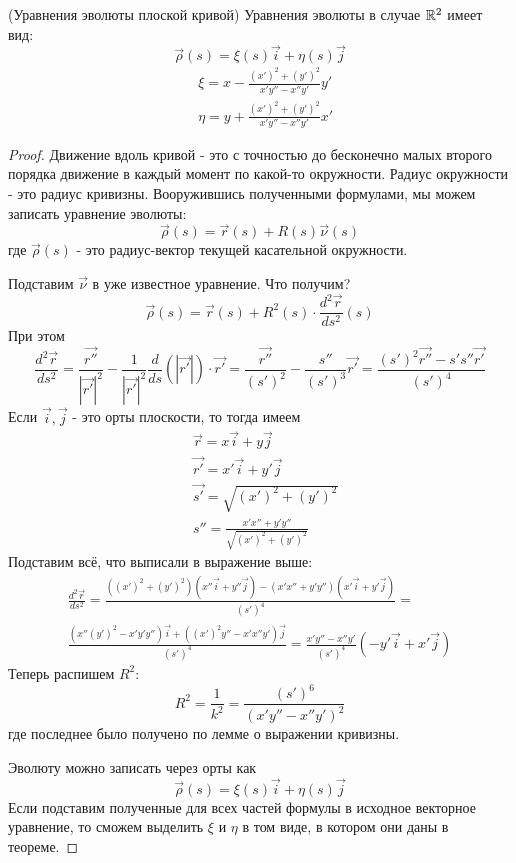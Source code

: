 \begin{theorem} (Уравнения эволюты плоской кривой)
	Уравнения эволюты в случае $\mathbb{R}^2$ имеет вид:
	\[
		\vec{\rho}(s) = \xi(s)\vec{i} + \eta(s)\vec{j}
	\]
	\begin{align*}
		&{\xi = x - \frac{(x')^2 + (y')^2}{x'y'' - x''y'}y'}
		\\
		&{\eta = y + \frac{(x')^2 + (y')^2}{x'y'' - x''y'}x'}
	\end{align*}
\end{theorem}

\begin{proof}
	Движение вдоль кривой - это с точностью до бесконечно малых второго порядка движение в каждый момент по какой-то окружности. Радиус окружности - это радиус кривизны. Вооружившись полученными формулами, мы можем записать уравнение эволюты:
	\[
	\vec{\rho}(s) = \vec{r}(s) + R(s) \vec{\nu}(s)
	\]
	где $\vec{\rho}(s)$ - это радиус-вектор текущей касательной окружности.
	
	Подставим $\vec{\nu}$ в уже известное уравнение. Что получим?
	\[
		\vec{\rho}(s) = \vec{r}(s) + R^2(s) \cdot \frac{d^2\vec{r}}{ds^2}(s)
	\]
	При этом
	\[
		\frac{d^2\vec{r}}{ds^2} = \frac{\vec{r''}}{|\vec{r'}|^2} - \frac{1}{|\vec{r'}|^2} \frac{d}{ds}(|\vec{r'}|) \cdot \vec{r'} = \frac{\vec{r''}}{(s')^2} - \frac{s''}{(s')^3}\vec{r'} = \frac{(s')^2 \vec{r''} - s's''\vec{r'}}{(s')^4}
	\]
	Если $\vec{i}, \vec{j}$ - это орты плоскости, то тогда имеем
	\begin{align*}
		&{\vec{r} = x\vec{i} + y\vec{j}}
		\\
		&{\vec{r'} = x'\vec{i} + y'\vec{j}}
		\\
		&{\vec{s'} = \sqrt{(x')^2 + (y')^2}}
		\\
		&{s'' = \frac{x'x'' + y'y''}{\sqrt{(x')^2 + (y')^2}}}
	\end{align*}
	Подставим всё, что выписали в выражение выше:
	\begin{multline*}
		\frac{d^2\vec{r}}{ds^2} = \frac{\left((x')^2 + (y')^2\right)(x''\vec{i} + y''\vec{j}) - (x'x'' + y'y'')(x'\vec{i} + y'\vec{j})}{(s')^4} =
		\\
		\frac{(x''(y')^2 - x'y'y'')\vec{i} + ((x')^2y'' - x'x''y')\vec{j}}{(s')^4} = \frac{x'y'' - x''y'}{(s')^4}(-y'\vec{i} + x'\vec{j})
	\end{multline*}
	Теперь распишем $R^2$:
	\[
		R^2 = \frac{1}{k^2} = \frac{(s')^6}{(x'y'' - x''y')^2}
	\]
	где последнее было получено по лемме о выражении кривизны.
	
	Эволюту можно записать через орты как
	\[
		\vec{\rho}(s) = \xi(s)\vec{i} + \eta(s)\vec{j}
	\]
	Если подставим полученные для всех частей формулы в исходное векторное уравнение, то сможем выделить $\xi$ и $\eta$ в том виде, в котором они даны в теореме.
\end{proof}

